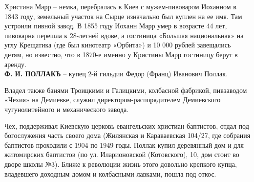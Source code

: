 Христина Марр – немка, перебралась в Киев с мужем-пивоваром Иоханном в 1843 году, земельный участок на Сырце изначально был куплен на ее имя. Там устроили пивной завод. В 1855 году Иоханн Марр умер в возрасте 44 лет, пивоварня перешла к 28-летней вдове, а гостиница «Большая национальная» на углу Крещатика (где был кинотеатр «Орбита») и 10 000 рублей завещались детям, но известно, что в 1870-е именно у Кристины Марр гостиницу берут в аренду.\\

\noindent\textbf{Ф. И. ПОЛЛАКЪ} – купец 2-й гильдии Федор (Франц) Иванович Поллак. 

Владел также банями Троицкими и Галицкими, колбасной фабрикой, пивзаводом «Чехия» на Демиевке, служил директором-распорядителем Демиевского чугунолитейного и механического завода.

Чех, поддерживал Киевскую церковь евангельских христиан баптистов, отдал под богослужения часть своего дома (Жилянская и Караваевская 104/27, где собрания баптистов проходили с 1904 по 1949 годы. Поллак купил деревянный дом и для житомирских баптистов (по ул. Иларионовской (Котовского), 10, дом стоит во дворе школы №3). Ближе к революции жизнь этого довольно крепкого купца, владевшего доходным домом и колбасными лавками, пошла под откос.

